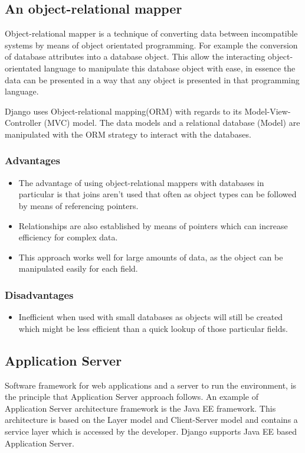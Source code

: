 \documentclass{article}
\begin{document}
	\subsection{An object-relational mapper}\label{subsec: ORM}
	Object-relational mapper is a technique of converting data between incompatible systems by means of object orientated programming. For example the conversion of database attributes into a database object. This allow the interacting object-orientated language to manipulate this database object with ease, in essence the data can be presented in a way that any object is presented in that programming language.
	
	Django uses Object-relational mapping(ORM) with regards to its Model-View-Controller (MVC) model.
	The data models and a relational database (Model) are manipulated with the ORM strategy to interact with the databases.
		
	
	\subsubsection{Advantages}
	\begin{itemize}
	\item
	The advantage of using object-relational mappers with databases in particular is that joins aren't used that often as object types can be followed by means of referencing pointers. 
	\item
	Relationships are also established by means of pointers which can increase efficiency for complex data.
	\item
	This approach works well for large amounts of data, as the object can be manipulated easily for each field.
	\end{itemize}
	
	\subsubsection{Disadvantages}
	
	\begin{itemize}
	\item
	 Inefficient when used with small databases as objects will still be created which might be less efficient than a quick lookup of those particular fields. 
	\end{itemize}
	
	
	\clearpage
	
	\subsection{Application Server}\label{subsec: ApplicationServer}
	Software framework for web applications and a server to run the environment, is the principle that Application Server approach follows. An example of Application Server architecture framework is the Java EE framework. This architecture is based on the Layer model and Client-Server model and contains a service layer which is accessed by the developer.
	Django supports Java EE based Application Server.
	
\end{document}
